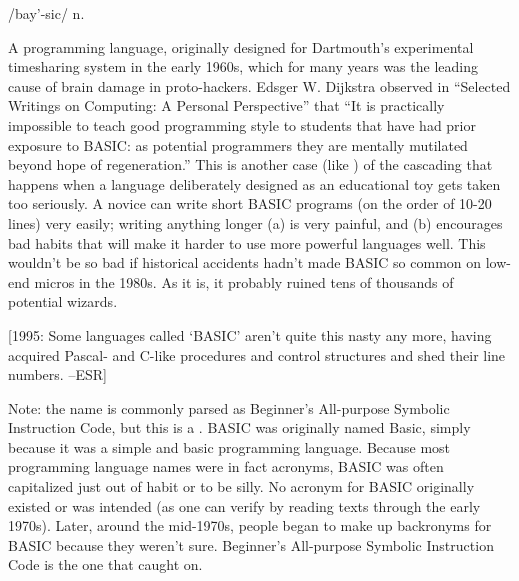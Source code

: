  /bay'-sic/ n.

A programming language, originally designed for Dartmouth's experimental
timesharing system in the early 1960s, which for many years was the leading
cause of brain damage in proto-hackers. Edsger W. Dijkstra observed in
``Selected Writings on Computing: A Personal Perspective'' that ``It is
practically impossible to teach good programming style to students that have had
prior exposure to BASIC: as potential programmers they are mentally mutilated
beyond hope of regeneration.'' This is another case (like ) of
the cascading  that happens when a language deliberately
designed as an educational toy gets taken too seriously. A novice can write
short BASIC programs (on the order of 10-20 lines) very easily; writing anything
longer (a) is very painful, and (b) encourages bad habits that will make it
harder to use more powerful languages well. This wouldn't be so bad if
historical accidents hadn't made BASIC so common on low-end micros in the 1980s.
As it is, it probably ruined tens of thousands of potential wizards.

[1995: Some languages called `BASIC' aren't quite this nasty any more, having
acquired Pascal- and C-like procedures and control structures and shed their
line numbers. --ESR]

Note: the name is commonly parsed as Beginner's All-purpose Symbolic Instruction
Code, but this is a . BASIC was originally named Basic,
simply because it was a simple and basic programming language. Because most
programming language names were in fact acronyms, BASIC was often capitalized
just out of habit or to be silly. No acronym for BASIC originally existed or was
intended (as one can verify by reading texts through the early 1970s). Later,
around the mid-1970s, people began to make up backronyms for BASIC because they
weren't sure. Beginner's All-purpose Symbolic Instruction Code is the one that
caught on.

